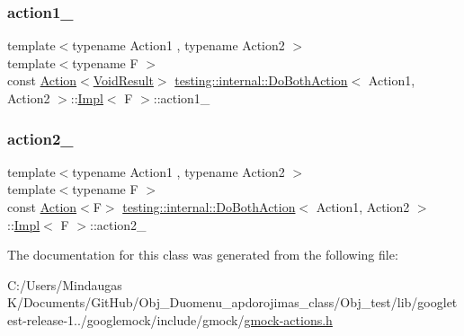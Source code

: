 \subsubsection{\texorpdfstring{action1\_}{action1\_}}
{\footnotesize\ttfamily template$<$typename Action1 , typename Action2 $>$ \\
template$<$typename F $>$ \\
const \mbox{\hyperlink{classtesting_1_1_action}{Action}}$<$\mbox{\hyperlink{classtesting_1_1internal_1_1_do_both_action_1_1_impl_a83909f0d1addcd1207ff45b128f33802}{Void\+Result}}$>$ \mbox{\hyperlink{classtesting_1_1internal_1_1_do_both_action}{testing\+::internal\+::\+Do\+Both\+Action}}$<$ Action1, Action2 $>$\+::\mbox{\hyperlink{classtesting_1_1internal_1_1_do_both_action_1_1_impl}{Impl}}$<$ F $>$\+::action1\+\_\+\hspace{0.3cm}{\ttfamily [private]}}

\mbox{\label{classtesting_1_1internal_1_1_do_both_action_1_1_impl_af1f725e8d028c532c07ee606df35dc44}} 
\subsubsection{\texorpdfstring{action2\_}{action2\_}}
{\footnotesize\ttfamily template$<$typename Action1 , typename Action2 $>$ \\
template$<$typename F $>$ \\
const \mbox{\hyperlink{classtesting_1_1_action}{Action}}$<$F$>$ \mbox{\hyperlink{classtesting_1_1internal_1_1_do_both_action}{testing\+::internal\+::\+Do\+Both\+Action}}$<$ Action1, Action2 $>$\+::\mbox{\hyperlink{classtesting_1_1internal_1_1_do_both_action_1_1_impl}{Impl}}$<$ F $>$\+::action2\+\_\+\hspace{0.3cm}{\ttfamily [private]}}



The documentation for this class was generated from the following file\+:\begin{DoxyCompactItemize}
\item 
C\+:/\+Users/\+Mindaugas K/\+Documents/\+Git\+Hub/\+Obj\+\_\+\+Duomenu\+\_\+apdorojimas\+\_\+class/\+Obj\+\_\+test/lib/googletest-\/release-\/1../googlemock/include/gmock/\mbox{\hyperlink{_obj__test_2lib_2googletest-release-1_88_81_2googlemock_2include_2gmock_2gmock-actions_8h}{gmock-\/actions.\+h}}\end{DoxyCompactItemize}
